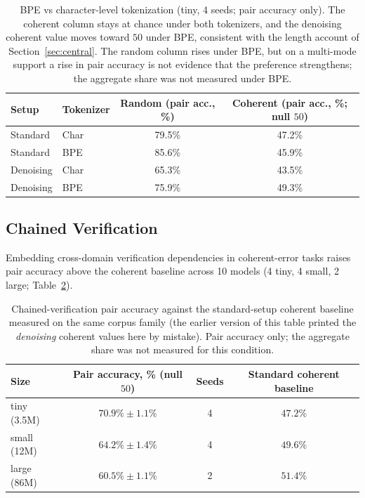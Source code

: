 \documentclass{article}
\begin{document}
\begin{table}[ht]
\centering
\small
\begin{tabular}{llcc}
\toprule
Setup & Tokenizer & Random (pair acc., \%) & Coherent (pair acc., \%; null $50$) \\
\midrule
Standard  & Char & 79.5\% & 47.2\% \\
Standard  & BPE  & 85.6\% & 45.9\% \\
Denoising & Char & 65.3\% & 43.5\% \\
Denoising & BPE  & 75.9\% & 49.3\% \\
\bottomrule
\end{tabular}
\caption{BPE vs character-level tokenization (tiny, 4 seeds; pair accuracy only). The coherent column stays at chance under both tokenizers, and the denoising coherent value moves toward $50$ under BPE, consistent with the length account of Section~\ref{sec:central}. The random column rises under BPE, but on a multi-mode support a rise in pair accuracy is not evidence that the preference strengthens; the aggregate share was not measured under BPE.}
\label{tab:bpe}
\end{table}

\subsection{Chained Verification}
\label{app:chained}

Embedding cross-domain verification dependencies in coherent-error tasks raises pair accuracy above the coherent baseline across 10 models (4 tiny, 4 small, 2 large; Table~\ref{tab:chained}).

\begin{table}[ht]
\centering
\small
\begin{tabular}{lccc}
\toprule
Size & Pair accuracy, \% (null $50$) & Seeds & Standard coherent baseline \\
\midrule
tiny (3.5M)  & $70.9\% \pm 1.1\%$ & 4 & $47.2\%$ \\
small (12M)  & $64.2\% \pm 1.4\%$ & 4 & $49.6\%$ \\
large (86M)  & $60.5\% \pm 1.1\%$ & 2 & $51.4\%$ \\
\bottomrule
\end{tabular}
\caption{Chained-verification pair accuracy against the standard-setup coherent baseline measured on the same corpus family (the earlier version of this table printed the \emph{denoising} coherent values here by mistake). Pair accuracy only; the aggregate share was not measured for this condition.}
\label{tab:chained}
\end{table}
\end{document}
